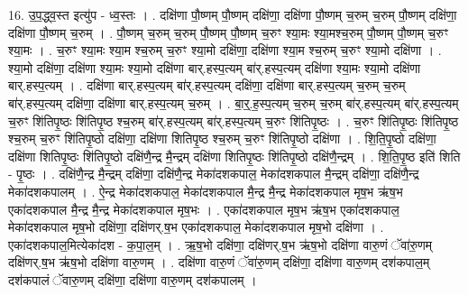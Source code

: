 \documentclass[17pt]{extarticle}
\begin{document}
16. उ॒प॒द्ध्व॒स्त इत्यु॑प - ध्व॒स्तः । . दक्षि॑णा पौ॒ष्णम् पौ॒ष्णम् दक्षि॑णा॒ दक्षि॑णा पौ॒ष्णम् च॒रुम् च॒रुम् पौ॒ष्णम् दक्षि॑णा॒ दक्षि॑णा पौ॒ष्णम् च॒रुम् । . पौ॒ष्णम् च॒रुम् च॒रुम् पौ॒ष्णम् पौ॒ष्णम् च॒रुꣳ श्या॒मः श्या॒मश्च॒रुम् पौ॒ष्णम् पौ॒ष्णम् च॒रुꣳ श्या॒मः । . च॒रुꣳ श्या॒मः श्या॒म श्च॒रुम् च॒रुꣳ श्या॒मो दक्षि॑णा॒ दक्षि॑णा श्या॒म श्च॒रुम् च॒रुꣳ श्या॒मो दक्षि॑णा । . श्या॒मो दक्षि॑णा॒ दक्षि॑णा श्या॒मः श्या॒मो दक्षि॑णा बार्.हस्प॒त्यम् बा॑र्.हस्प॒त्यम् दक्षि॑णा श्या॒मः श्या॒मो दक्षि॑णा बार्.हस्प॒त्यम् । . दक्षि॑णा बार्.हस्प॒त्यम् बा॑र्.हस्प॒त्यम् दक्षि॑णा॒ दक्षि॑णा बार्.हस्प॒त्यम् च॒रुम् च॒रुम् बा॑र्.हस्प॒त्यम् दक्षि॑णा॒ दक्षि॑णा बार्.हस्प॒त्यम् च॒रुम् । . बा॒र्॒.ह॒स्प॒त्यम् च॒रुम् च॒रुम् बा॑र्.हस्प॒त्यम् बा॑र्.हस्प॒त्यम् च॒रुꣳ शि॑तिपृ॒ष्ठः शि॑तिपृ॒ष्ठ श्च॒रुम् बा॑र्.हस्प॒त्यम् बा॑र्.हस्प॒त्यम् च॒रुꣳ शि॑तिपृ॒ष्ठः । . च॒रुꣳ शि॑तिपृ॒ष्ठः शि॑तिपृ॒ष्ठ श्च॒रुम् च॒रुꣳ शि॑तिपृ॒ष्ठो दक्षि॑णा॒ दक्षि॑णा शितिपृ॒ष्ठ श्च॒रुम् च॒रुꣳ शि॑तिपृ॒ष्ठो दक्षि॑णा । . शि॒ति॒पृ॒ष्ठो दक्षि॑णा॒ दक्षि॑णा शितिपृ॒ष्ठः शि॑तिपृ॒ष्ठो दक्षि॑णै॒न्द्र मै॒न्द्रम् दक्षि॑णा शितिपृ॒ष्ठः शि॑तिपृ॒ष्ठो दक्षि॑णै॒न्द्रम् । . शि॒ति॒पृ॒ष्ठ इति॑ शिति - पृ॒ष्ठः । . दक्षि॑णै॒न्द्र मै॒न्द्रम् दक्षि॑णा॒ दक्षि॑णै॒न्द्र मेका॑दशकपाल॒ मेका॑दशकपाल मै॒न्द्रम् दक्षि॑णा॒ दक्षि॑णै॒न्द्र मेका॑दशकपालम् । . ऐ॒न्द्र मेका॑दशकपाल॒ मेका॑दशकपाल मै॒न्द्र मै॒न्द्र मेका॑दशकपाल मृष॒भ ऋ॑ष॒भ एका॑दशकपाल मै॒न्द्र मै॒न्द्र मेका॑दशकपाल मृष॒भः । . एका॑दशकपाल मृष॒भ ऋ॑ष॒भ एका॑दशकपाल॒ मेका॑दशकपाल मृष॒भो दक्षि॑णा॒ दक्षि॑णर्.ष॒भ एका॑दशकपाल॒ मेका॑दशकपाल मृष॒भो दक्षि॑णा । . एका॑दशकपाल॒मित्येका॑दश - क॒पा॒ल॒म् । . ऋ॒ष॒भो दक्षि॑णा॒ दक्षि॑णर्.ष॒भ ऋ॑ष॒भो दक्षि॑णा वारु॒णं ॅवा॑रु॒णम् दक्षि॑णर्.ष॒भ ऋ॑ष॒भो दक्षि॑णा वारु॒णम् । . दक्षि॑णा वारु॒णं ॅवा॑रु॒णम् दक्षि॑णा॒ दक्षि॑णा वारु॒णम् दश॑कपाल॒म् दश॑कपालं ॅवारु॒णम् दक्षि॑णा॒ दक्षि॑णा वारु॒णम् दश॑कपालम् । \newline
\end{document}

